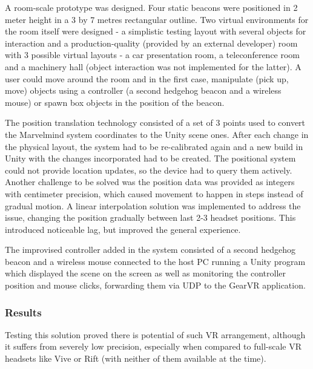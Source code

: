 \documentclass[12pt, a4paper]{article}
\begin{document}
A room-scale prototype was designed. Four static beacons were positioned in 2 meter height in a 3 by 7 metres rectangular outline. Two virtual environments for the room itself were designed - a simplistic testing layout with several objects for interaction and a production-quality (provided by an external developer) room with 3 possible virtual layouts - a car presentation room, a teleconference room and a machinery hall (object interaction was not implemented for the latter). A user could move around the room and in the first case, manipulate (pick up, move) objects using a controller (a second hedgehog beacon and a wireless mouse) or spawn box objects in the position of the beacon.

The position translation technology consisted of a set of 3 points used to convert the Marvelmind system coordinates to the Unity scene ones. After each change in the physical layout, the system had to be re-calibrated again and a new build in Unity with the changes incorporated had to be created. The positional system could not provide location updates, so the device had to query them actively. Another challenge to be solved was the position data was provided as integers with centimeter precision, which caused movement to happen in steps instead of gradual motion. A linear interpolation solution was implemented to address the issue, changing the position gradually between last 2-3 headset positions. This introduced noticeable lag, but improved the general experience.

The improvised controller added in the system consisted of a second hedgehog beacon and a wireless mouse connected to the host PC running a Unity program which displayed the scene on the screen as well as monitoring the controller position and mouse clicks, forwarding them via UDP to the GearVR application.


\subsubsection{Results}
Testing this solution proved there is potential of such VR arrangement, although it suffers from severely low precision, especially when compared to full-scale VR headsets like Vive or Rift (with neither of them available at the time).
\end{document}
